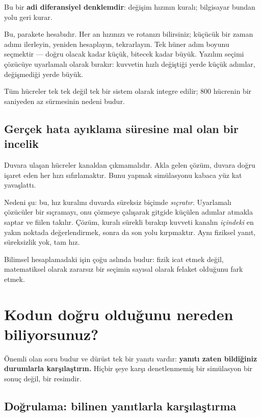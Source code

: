 \documentclass[11pt,a4paper]{article}
\begin{document}
Bu bir \textbf{adi diferansiyel denklemdir}: değişim hızının kuralı; bilgisayar
bundan yolu geri kurar.

\begin{analogy}
Bu, parakete hesabıdır. Her an hızınızı ve rotanızı bilirsiniz; küçücük bir
zaman adımı ilerleyin, yeniden hesaplayın, tekrarlayın. Tek hüner adım boyunu
seçmektir --- doğru olacak kadar küçük, bitecek kadar büyük. Yazılım seçimi
çözücüye uyarlamalı olarak bırakır: kuvvetin hızlı değiştiği yerde küçük adımlar,
değişmediği yerde büyük.
\end{analogy}

Tüm hücreler tek tek değil tek bir sistem olarak integre edilir; 800 hücrenin bir
saniyeden az sürmesinin nedeni budur.

\subsection*{Gerçek hata ayıklama süresine mal olan bir incelik}

Duvara ulaşan hücreler kanaldan çıkmamalıdır. Akla gelen çözüm, duvara doğru
işaret eden her hızı sıfırlamaktır. Bunu yapmak simülasyonu kabaca yüz kat
yavaşlattı.

Nedeni şu: bu, hız kuralını duvarda süreksiz biçimde \emph{sıçratır}. Uyarlamalı
çözücüler bir sıçramayı, onu çözmeye çalışarak gitgide küçülen adımlar atmakla
saptar ve fiilen takılır. Çözüm, kuralı sürekli bırakıp kuvveti kanalın
\emph{içindeki} en yakın noktada değerlendirmek, sonra da son yolu kırpmaktır.
Aynı fiziksel yanıt, süreksizlik yok, tam hız.

\begin{plain}
Bilimsel hesaplamadaki işin çoğu aslında budur: fizik icat etmek değil,
matematiksel olarak zararsız bir seçimin sayısal olarak felaket olduğunu fark
etmek.
\end{plain}

\section{Kodun doğru olduğunu nereden biliyorsunuz?}

Önemli olan soru budur ve dürüst tek bir yanıtı vardır: \textbf{yanıtı zaten
bildiğiniz durumlarla karşılaştırın.} Hiçbir şeye karşı denetlenmemiş bir
simülasyon bir sonuç değil, bir resimdir.

\subsection*{Doğrulama: bilinen yanıtlarla karşılaştırma}
\end{document}
